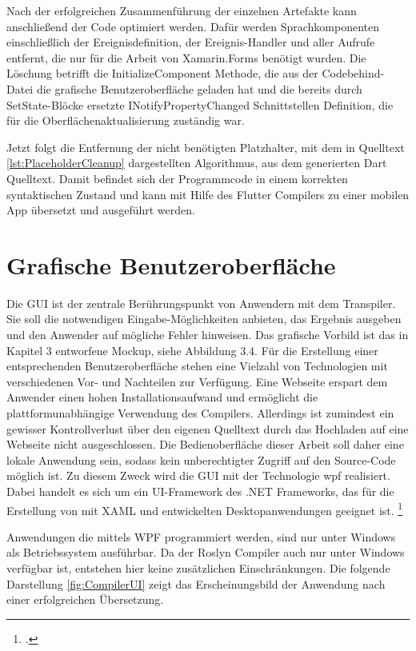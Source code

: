 Nach der erfolgreichen Zusammenführung der einzelnen Artefakte kann anschließend der Code optimiert werden. Dafür werden Sprachkomponenten einschließlich der Ereignisdefinition,  der Ereignis-Handler und aller Aufrufe entfernt, die  nur für die  Arbeit von Xamarin.Forms benötigt  wurden. Die Löschung betrifft die \glq InitializeComponent\grq{}  Methode, die aus der Codebehind-Datei die grafische Benutzeroberfläche geladen hat und die bereits durch SetState-Blöcke ersetzte
 \glq INotifyPropertyChanged\grq{}   Schnittstellen Definition, die für 
die Oberflächenaktualisierung zuständig war.

Jetzt folgt die Entfernung der nicht benötigten Platzhalter,  mit dem in Quelltext \ref{lst:PlaceholderCleanup} dargestellten Algorithmus,  aus dem generierten Dart Quelltext.  Damit befindet sich der Programmcode in einem korrekten syntaktischen Zustand und kann mit Hilfe des Flutter Compilers zu einer mobilen App übersetzt und ausgeführt werden. 




\section{Grafische Benutzeroberfläche}
Die GUI ist der zentrale Berührungspunkt von Anwendern mit dem Transpiler.  Sie soll die notwendigen Eingabe-Möglichkeiten anbieten, das Ergebnis ausgeben und den Anwender auf mögliche Fehler hinweisen.  Das grafische Vorbild ist das in Kapitel 3 entworfene Mockup, siehe Abbildung 3.4.  Für die Erstellung einer entsprechenden Benutzeroberfläche stehen eine Vielzahl von Technologien mit verschiedenen Vor- und Nachteilen zur Verfügung. Eine Webseite erspart dem Anwender einen hohen Installationsaufwand und ermöglicht die plattformunabhängige Verwendung des Compilers.  Allerdings ist zumindest ein gewisser Kontrollverlust über den eigenen Quelltext durch das  Hochladen auf eine Webseite nicht ausgeschlossen.  Die Bedienoberfläche dieser Arbeit soll daher eine lokale Anwendung sein, sodass kein  unberechtigter Zugriff auf den Source-Code möglich ist.  Zu diesem Zweck wird die GUI mit der Technologie \ac{wpf} realisiert.  Dabei handelt es sich um ein UI-Framework des .NET Frameworks, das für die Erstellung von mit XAML und \Csharp entwickelten Desktopanwendungen geeignet ist. \footcite[Vgl.][S. 1f]{Wenger2012} 

Anwendungen die mittels WPF programmiert werden, sind nur unter Windows als Betriebssystem ausführbar.  Da der Roslyn Compiler auch nur unter Windows verfügbar ist,  entstehen hier keine zusätzlichen Einschränkungen.  Die folgende Darstellung \ref{fig:CompilerUI} zeigt das Erscheinungsbild der Anwendung nach einer erfolgreichen Übersetzung.

